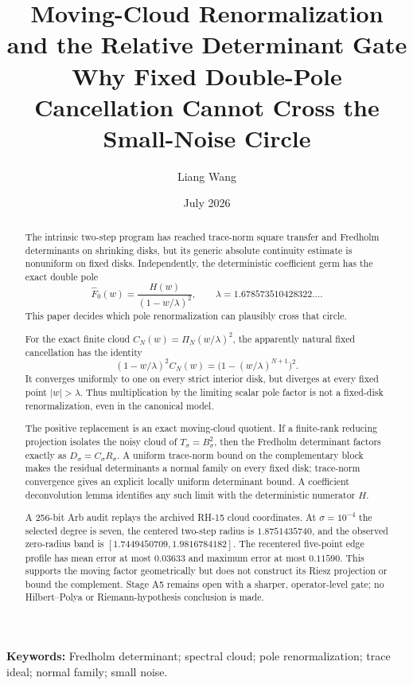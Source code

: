 \documentclass[11pt]{article}
\title{Moving-Cloud Renormalization and the Relative Determinant Gate\\
\large Why Fixed Double-Pole Cancellation Cannot Cross the Small-Noise Circle}
\author{Liang Wang}
\date{July 2026}
\theoremstyle{remark}
\begin{document}
\maketitle

\begin{abstract}
The intrinsic two-step program has reached trace-norm square transfer and
Fredholm determinants on shrinking disks, but its generic absolute
continuity estimate is nonuniform on fixed disks.  Independently, the
deterministic coefficient germ has the exact double pole
\[
 \widehat F_0(w)=\frac{H(w)}{(1-w/\lambda)^2},
 \qquad \lambda=1.678573510428322\ldots .
\]
This paper decides which pole renormalization can plausibly cross that circle.

For the exact finite cloud
$C_N(w)=\Pi_N(w/\lambda)^2$, the apparently natural fixed cancellation has
the identity
\[
 (1-w/\lambda)^2C_N(w)
 =\bigl(1-(w/\lambda)^{N+1}\bigr)^2.
\]
It converges uniformly to one on every strict interior disk, but diverges at
every fixed point $|w|>\lambda$.  Thus multiplication by the limiting scalar
pole factor is not a fixed-disk renormalization, even in the canonical model.

The positive replacement is an exact moving-cloud quotient.  If a finite-rank
reducing projection isolates the noisy cloud of $T_\sigma=B_\sigma^2$, then
the Fredholm determinant factors exactly as $D_\sigma=C_\sigma R_\sigma$.
A uniform trace-norm bound on the complementary block makes the residual
determinants a normal family on every fixed disk; trace-norm convergence gives
an explicit locally uniform determinant bound.  A coefficient deconvolution
lemma identifies any such limit with the deterministic numerator $H$.

A 256-bit Arb audit replays the archived RH-15 cloud coordinates.  At
$\sigma=10^{-4}$ the selected degree is seven, the centered two-step radius is
$1.8751435740$, and the observed zero-radius band is
$[1.7449450709,1.9816784182]$.  The recentered five-point edge profile has mean
error at most $0.03633$ and maximum error at most $0.11590$.  This supports the
moving factor geometrically but does not construct its Riesz projection or
bound the complement.  Stage A5 remains open with a sharper, operator-level
gate; no Hilbert--Polya or Riemann-hypothesis conclusion is made.
\end{abstract}

\noindent\textbf{Keywords:} Fredholm determinant; spectral cloud; pole
renormalization; trace ideal; normal family; small noise.
\end{document}
